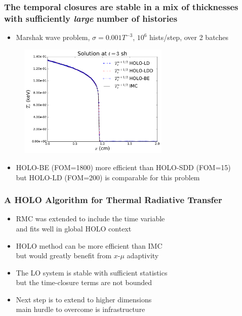 \documentclass[xcolor=dvipsnames,hyperref={pdfpagelabels=false},unknownkeysallowed]{beamer}
\newcommand{\colG}[1]{{\color{Gray!110} #1}}
\newlength{\wideitemsep}
\let\olditem\item
\renewcommand{\item}{\setlength{\itemsep}{\wideitemsep}\olditem}
\newcommand{\shorttitle}{\color{black} A HOLO Algorithm for Thermal Radiative Transfer
    \makebox[\linewidth]{\rule{\textwidth}{5pt}}
}
\begin{document}
\begin{frame}
        \frametitle{The temporal closures are stable in a mix of thicknesses \\  with
    sufficiently \emph{large} number of histories}
{\addtolength{\leftmargini}{-0.2in}
    \fontsize{9.0pt}{10.0pt}\selectfont
    \vspace{0.1in}
    \begin{itemize}
        \item Marshak wave problem, $\sigma=0.001 T^{-3}$, $10^6$ hists/step, over 2 batches
    \end{itemize}
            \begin{figure}[H]
    \centering
    \includegraphics[width=0.64\textwidth]{marshak_time_cont_compare.pdf}
\end{figure}
\begin{itemize}
    \item HOLO-BE (FOM=1800) more efficient than HOLO-SDD (FOM=15) \\ but HOLO-LD (FOM=200) is comparable for this problem
    \end{itemize}
}
\end{frame}

\begin{frame}
    \frametitle{\shorttitle}
    \begin{itemize}
        \item[] RMC was extended to include the time variable\\
            \colG{and fits well in global HOLO context}
        \item[] HOLO method can be more efficient than IMC \\
            \colG{but would greatly benefit from $x$-$\mu$ adaptivity}
        \item[] The LO system is stable with sufficient statistics \\
            \colG{but the time-closure terms are not bounded}
        \item[] Next step is to extend to higher dimensions \\
            \colG{main hurdle to overcome is infrastructure}
    \end{itemize}
\end{frame}
\end{document}

